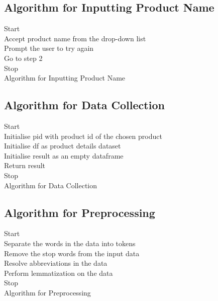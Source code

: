 \documentclass[11pt]{report}
\begin{document}
\subsection{Algorithm for Inputting Product Name}
\vspace{0.5cm}
\begin{algorithm}[H]
\SetAlgoLined
{}
Start \\
Accept product name from the drop-down list\\
   {
   Prompt the user to try again\\
   Go to step 2\\
   }
Stop \\
\caption{Algorithm for Inputting Product Name}
\end{algorithm}
\vspace{0.5cm}

\subsection{Algorithm for Data Collection}
\vspace{0.5cm}
\begin{algorithm}[H]
\SetAlgoLined
{}
Start \\
Initialise pid with product id of the chosen product \\
Initialise df as product details dataset\\
Initialise result as an empty dataframe \\
Return result \\
Stop \\
\caption{Algorithm for Data Collection}
\end{algorithm}
\vspace{0.5cm}

\subsection{Algorithm for Preprocessing}
\vspace{0.5cm}
\begin{algorithm}[H]
\SetAlgoLined
{}
Start \\
Separate the words in the data into tokens \\
Remove the stop words from the input data \\
Resolve abbreviations in the data \\
Perform lemmatization on the data \\
Stop \\
\caption{Algorithm for Preprocessing}
\end{algorithm}
\vspace{0.5cm}
\end{document}
